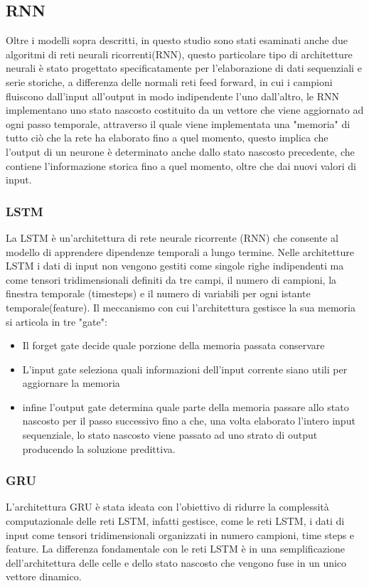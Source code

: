 \subsection{RNN}
Oltre i modelli sopra descritti, in questo studio sono stati esaminati anche due algoritmi di reti neurali ricorrenti(RNN), questo particolare tipo di architetture neurali è stato progettato specificatamente per l'elaborazione di dati sequenziali e serie storiche, a differenza delle normali reti feed forward, in cui i campioni fluiscono dall'input all'output in modo indipendente l'uno dall'altro, le RNN implementano uno stato nascosto costituito da un vettore che viene aggiornato ad ogni passo temporale, attraverso il quale viene implementata una "memoria" di tutto ciò che la rete ha elaborato fino a quel momento, questo implica che l'output di un neurone è determinato anche dallo stato nascosto precedente, che contiene l'informazione storica fino a quel momento, oltre che dai nuovi valori di input.

\subsubsection{LSTM}
La LSTM è un'architettura di rete neurale ricorrente (RNN) che consente al modello di apprendere dipendenze temporali a lungo termine. Nelle architetture LSTM i dati di input non vengono gestiti come singole righe indipendenti ma come tensori tridimensionali definiti da tre campi, il numero di campioni, la finestra temporale (timesteps) e il numero di variabili per ogni istante temporale(feature). Il meccanismo con cui l'architettura gestisce la sua memoria si articola in tre "gate":
\begin{itemize}
	\item Il forget gate decide quale porzione della memoria passata conservare
	\item L'input gate seleziona quali informazioni dell'input corrente siano utili per aggiornare la memoria
	\item infine l'output gate determina quale parte della memoria passare allo stato nascosto per il passo successivo fino a che, una volta elaborato l'intero input sequenziale, lo stato nascosto viene passato ad uno strato di output producendo la soluzione predittiva.
\end{itemize}

\subsubsection{GRU}
L'architettura GRU è stata ideata con l'obiettivo di ridurre la complessità computazionale delle reti LSTM, infatti gestisce, come le reti LSTM, i dati di input come tensori tridimensionali organizzati in numero campioni, time steps e feature. La differenza fondamentale con le reti LSTM è in una semplificazione dell'architettura delle celle e dello stato nascosto che vengono fuse in un unico vettore dinamico.

